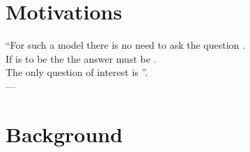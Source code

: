 
\chapter{Motivations}
\label{ch:motivations}
\bigskip
\begin{flushright}
    ``For such a model there is no need to ask the question . \\
    If  is to be the  the answer must
    be . \\
    The only question of interest is ''. \\
    --- 
    \citep{box1979robustness}
\end{flushright}
\bigskip
\begin{justify}
\end{justify}
\minitoc


\chapter{Background}
\label{ch:background}
\bigskip
\begin{justify}
\end{justify}
\minitoc

